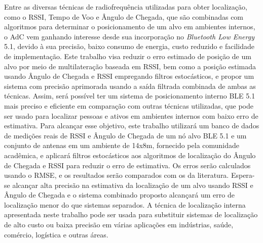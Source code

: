 \begin{resumo}
Entre as diversas técnicas de radiofrequência utilizadas para obter localização, como o RSSI, Tempo de Voo e Ângulo de Chegada, que são combinadas com algoritmos para determinar o posicionamento de um alvo em ambientes internos, o AdC vem ganhando interesse desde sua incorporação no \textit{Bluetooth Low Energy} 5.1, devido à sua precisão, baixo consumo de energia, custo reduzido e facilidade de implementação. Este trabalho visa reduzir o erro estimado de posição de um alvo por meio de multilateração baseada em RSSI, bem como a posição estimada usando Ângulo de Chegada e RSSI empregando filtros estocásticos, e propor um sistema com precisão aprimorada usando a saída filtrada combinada de ambas as técnicas. Assim, será possível ter um sistema de posicionamento interno BLE 5.1 mais preciso e eficiente em comparação com outras técnicas utilizadas, que pode ser usado para localizar pessoas e ativos em ambientes internos com baixo erro de estimativa. Para alcançar esse objetivo, este trabalho utilizará um banco de dados de medições reais de RSSI e Ângulo de Chegada de um nó alvo BLE 5.1 e um conjunto de antenas em um ambiente de 14x8m, fornecido pela comunidade acadêmica, e aplicará filtros estocásticos aos algoritmos de localização do Ângulo de Chegada e RSSI para reduzir o erro de estimativa. Os erros serão calculados usando o RMSE, e os resultados serão comparados com os da literatura. Espera-se alcançar alta precisão na estimativa da localização de um alvo usando RSSI e Ângulo de Chegada e o sistema combinado proposto alcançará um erro de localização menor do que sistemas separados. A técnica de localização interna apresentada neste trabalho pode ser usada para substituir sistemas de localização de alto custo ou baixa precisão em várias aplicações em indústrias, saúde, comércio, logística e outras áreas.
\end{resumo}
